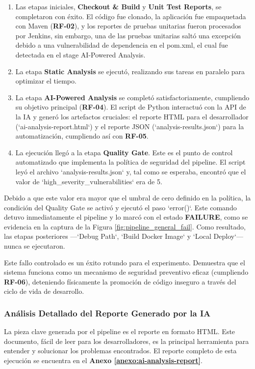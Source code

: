 \begin{enumerate}
    \item Las etapas iniciales, \textbf{Checkout \& Build} y \textbf{Unit Test Reports}, se completaron con éxito. El código fue clonado, la aplicación fue empaquetada con Maven (\textbf{RF-02}), y los reportes de pruebas unitarias fueron procesados por Jenkins, sin embargo, una de las pruebas unitarias saltó una excepción debido a una vulnerabilidad de dependencia en el pom.xml, el cual fue detectada en el stage AI-Powered Analysis.
    \item La etapa \textbf{Static Analysis} se ejecutó, realizando sus tareas en paralelo para optimizar el tiempo.
    \item La etapa \textbf{AI-Powered Analysis} se completó satisfactoriamente, cumpliendo su objetivo principal (\textbf{RF-04}). El script de Python interactuó con la API de la IA y generó los artefactos cruciales: el reporte HTML para el desarrollador (`ai-analysis-report.html`) y el reporte JSON (`analysis-results.json`) para la automatización, cumpliendo así con \textbf{RF-05}.
    \item La ejecución llegó a la etapa \textbf{Quality Gate}. Este es el punto de control automatizado que implementa la política de seguridad del pipeline. El script leyó el archivo `analysis-results.json` y, tal como se esperaba, encontró que el valor de `high\_severity\_vulnerabilities` era de 5. 
\end{enumerate}

Debido a que este valor era mayor que el umbral de cero definido en la política, la condición del Quality Gate se activó y ejecutó el paso `error()`. Este comando detuvo inmediatamente el pipeline y lo marcó con el estado \textbf{FAILURE}, como se evidencia en la captura de la Figura \ref{fig:pipeline_general_fail}. Como resultado, las etapas posteriores —`Debug Path`, `Build Docker Image` y `Local Deploy`— nunca se ejecutaron.

Este fallo controlado es un éxito rotundo para el experimento. Demuestra que el sistema funciona como un mecanismo de seguridad preventivo eficaz (cumpliendo \textbf{RF-06}), deteniendo físicamente la promoción de código inseguro a través del ciclo de vida de desarrollo.

\subsubsection{Análisis Detallado del Reporte Generado por la IA}
La pieza clave generada por el pipeline es el reporte en formato HTML. Este documento, fácil de leer para los desarrolladores, es la principal herramienta para entender y solucionar los problemas encontrados. El reporte completo de esta ejecución se encuentra en el \textbf{Anexo \ref{anexo:ai-analysis-report}}.

